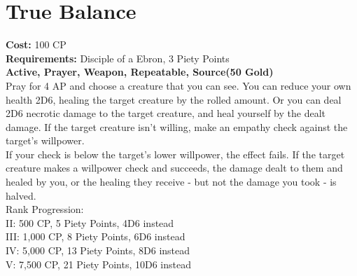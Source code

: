 \section{True Balance}\label{prayer:trueBalance}
\textbf{Cost:} 100 CP\\
\textbf{Requirements:} Disciple of a Ebron, 3 Piety Points \\
\textbf{Active, Prayer, Weapon, Repeatable, Source(50 Gold)}\\
Pray for 4 AP and choose a creature that you can see.
You can reduce your own health 2D6, healing the target creature by the rolled amount.
Or you can deal 2D6 necrotic damage to the target creature, and heal yourself by the dealt damage.
If the target creature isn't willing, make an empathy check against the target's willpower.\\
If your check is below the target's lower willpower, the effect fails.
If the target creature makes a willpower check and succeeds, the damage dealt to them and healed by you, or the healing they receive - but not the damage you took - is halved.
\\
Rank Progression:\\
II: 500 CP, 5 Piety Points, 4D6 instead\\
III: 1,000 CP, 8 Piety Points, 6D6 instead\\
IV: 5,000 CP, 13 Piety Points, 8D6 instead\\
V: 7,500 CP, 21 Piety Points, 10D6 instead\\